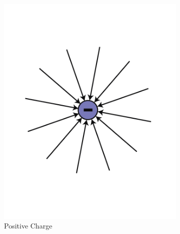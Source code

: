 \begin{figure}[htbp]
  \centering
  \begin{subfigure}[b]{0.3\textwidth}
      \includegraphics[width=\textwidth]{Images/11.4a}
      \caption{Positive Charge}
      \label{fig:11.5a}
  \end{subfigure}
  \begin{subfigure}[b]{0.3\textwidth}

\end{subfigure}
\end{figure}
